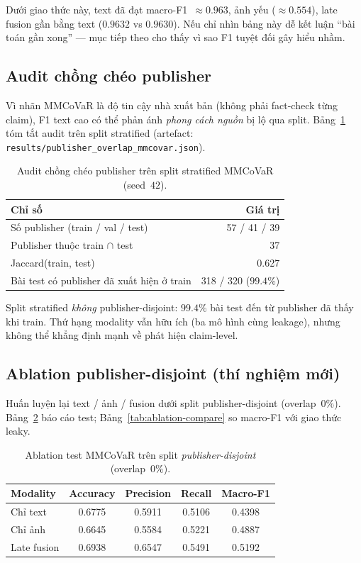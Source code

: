 \documentclass[12pt, a4paper]{report}
\begin{document}
Dưới giao thức này, text đã đạt macro-F1~$\approx 0.963$, ảnh yếu ($\approx 0.554$), late fusion gần bằng text ($0.9632$ vs $0.9630$).
Nếu chỉ nhìn bảng này dễ kết luận ``bài toán gần xong'' --- mục tiếp theo cho thấy vì sao F1 tuyệt đối gây hiểu nhầm.

\subsection{Audit chồng chéo publisher}
\label{sec:publisher-overlap}

Vì nhãn MMCoVaR là độ tin cậy nhà xuất bản (không phải fact-check từng claim), F1 text cao có thể phản ánh \emph{phong cách nguồn} bị lộ qua split.
Bảng~\ref{tab:publisher-overlap} tóm tắt audit trên split stratified (artefact: \texttt{results/publisher\_overlap\_mmcovar.json}).

\begin{table}[htbp]
\centering
\caption{Audit chồng chéo publisher trên split stratified MMCoVaR (seed~$42$).}
\label{tab:publisher-overlap}
\begin{tabular}{lr}
\hline
Chỉ số & Giá trị \\
\hline
Số publisher (train / val / test) & 57 / 41 / 39 \\
Publisher thuộc train $\cap$ test & 37 \\
Jaccard(train, test) & 0.627 \\
Bài test có publisher đã xuất hiện ở train & 318 / 320 ($99.4\%$) \\
\hline
\end{tabular}
\end{table}

Split stratified \emph{không} publisher-disjoint: $99.4\%$ bài test đến từ publisher đã thấy khi train.
Thứ hạng modality vẫn hữu ích (ba mô hình cùng leakage), nhưng không thể khẳng định mạnh về phát hiện claim-level.

\subsection{Ablation publisher-disjoint (thí nghiệm mới)}
\label{sec:pubdisjoint}

Huấn luyện lại text / ảnh / fusion dưới split publisher-disjoint (overlap~$0\%$).
Bảng~\ref{tab:ablation-pubdisjoint} báo cáo test; Bảng~\ref{tab:ablation-compare} so macro-F1 với giao thức leaky.

\begin{table}[htbp]
\centering
\caption{Ablation test MMCoVaR trên split \emph{publisher-disjoint} (overlap~$0\%$).}
\label{tab:ablation-pubdisjoint}
\begin{tabular}{lcccc}
\hline
Modality & Accuracy & Precision & Recall & Macro-F1 \\
\hline
Chỉ text & 0.6775 & 0.5911 & 0.5106 & 0.4398 \\
Chỉ ảnh & 0.6645 & 0.5584 & 0.5221 & 0.4887 \\
Late fusion & 0.6938 & 0.6547 & 0.5491 & 0.5192 \\
\hline
\end{tabular}
\end{table}
\end{document}
